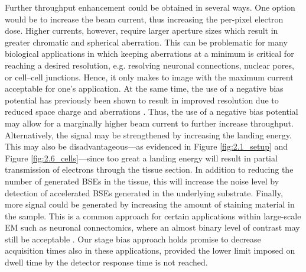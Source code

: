 Further throughput enhancement could be obtained in several ways. One option would be to increase the beam current, thus increasing the per-pixel electron dose. Higher currents, however, require larger aperture sizes which result in greater chromatic and spherical aberration. This can be problematic for many biological applications in which keeping aberrations at a minimum is critical for reaching a desired resolution, e.g. resolving neuronal connections, nuclear pores, or cell–cell junctions. Hence, it only makes to image with the maximum current acceptable for one’s application. At the same time, the use of a negative bias potential has previously been shown to result in improved resolution due to reduced space charge and aberrations \cite{paden1968retarding, mullerova2003scanning}. Thus, the use of a negative bias potential may allow for a marginally higher beam current to further increase throughput. Alternatively, the signal may be strengthened by increasing the landing energy. This may also be disadvantageous---as evidenced in Figure \ref{fig:2.1_setup} and Figure \ref{fig:2.6_cells}---since too great a landing energy will result in partial transmission of electrons through the tissue section. In addition to reducing the number of generated BSEs in the tissue, this will increase the noise level by detection of accelerated BSEs generated in the underlying substrate. Finally, more signal could be generated by increasing the amount of staining material in the sample. This is a common approach for certain applications within large-scale EM such as neuronal connectomics, where an almost binary level of contrast may still be acceptable \cite{kuipers2015scanning}. Our stage bias approach holds promise to decrease acquisition times also in these applications, provided the lower limit imposed on dwell time by the detector response time is not reached.
